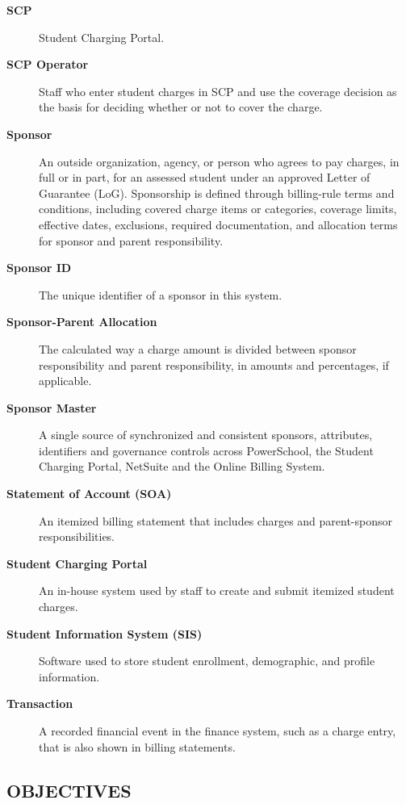 \begin{description}
    \item[\textbf{SCP}] Student Charging Portal.

    \item[\textbf{SCP Operator}] Staff who enter student charges in SCP and use the coverage decision as the basis for deciding whether or not to cover the charge.

    \item[\textbf{Sponsor}] An outside organization, agency, or person who agrees to pay charges, in full or in part, for an assessed student under an approved Letter of Guarantee (LoG). Sponsorship is defined through billing-rule terms and conditions, including covered charge items or categories, coverage limits, effective dates, exclusions, required documentation, and allocation terms for sponsor and parent responsibility.

    \item[\textbf{Sponsor ID}] The unique identifier of a sponsor in this system.

    \item[\textbf{Sponsor-Parent Allocation}] The calculated way a charge amount is divided between sponsor responsibility and parent responsibility, in amounts and percentages, if applicable.

    \item[\textbf{Sponsor Master}] A single source of synchronized and consistent sponsors, attributes, identifiers and governance controls across PowerSchool, the Student Charging Portal, NetSuite and the Online Billing System.

    \item[\textbf{Statement of Account (SOA)}] An itemized billing statement that includes charges and parent-sponsor responsibilities.

    \item[\textbf{Student Charging Portal}] An in-house system used by staff to create and submit itemized student charges.

    \item[\textbf{Student Information System (SIS)}] Software used to store student enrollment, demographic, and profile information.

    \item[\textbf{Transaction}] A recorded financial event in the finance system, such as a charge entry, that is also shown in billing statements.
\end{description}
\pagebreak

\subsection{OBJECTIVES}

